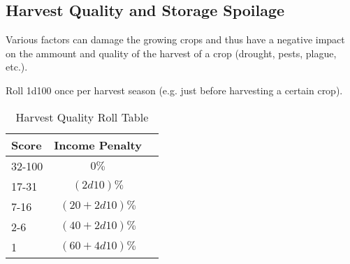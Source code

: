 \documentclass[a4paper,10pt]{article}
\begin{document}
\subsection{Harvest Quality and Storage Spoilage}
Various factors can damage the growing crops and thus have a negative impact on
the ammount and quality of the harvest of a crop (drought, pests, plague, etc.).

Roll 1d100 once per harvest season (e.g. just before harvesting a certain crop).

\begin{table}
  \caption{Harvest Quality Roll Table}
  \begin{tabular}{lcc}
    \toprule
    Score  & Income Penalty \\
    \midrule
    32-100 & $0\%$          \\
    17-31  & $(2d10)\%$     \\
    7-16   & $(20 + 2d10)\%$\\
    2-6    & $(40 + 2d10)\%$\\
    1      & $(60 + 4d10)\%$\\
    \bottomrule
  \end{tabular}
\end{table}
\end{document}
